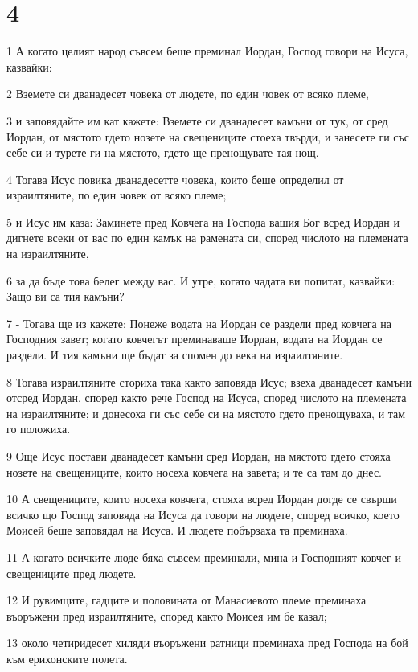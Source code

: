 \chapter{4}

\par 1 А когато целият народ съвсем беше преминал Иордан, Господ говори на Исуса, казвайки:
\par 2 Вземете си дванадесет човека от людете, по един човек от всяко племе,
\par 3 и заповядайте им кат кажете: Вземете си дванадесет камъни от тук, от сред Иордан, от мястото гдето нозете на свещениците стоеха твърди, и занесете ги със себе си и турете ги на мястото, гдето ще пренощувате тая нощ.
\par 4 Тогава Исус повика дванадесетте човека, които беше определил от израилтяните, по един човек от всяко племе;
\par 5 и Исус им каза: Заминете пред Ковчега на Господа вашия Бог всред Иордан и дигнете всеки от вас по един камък на рамената си, според числото на племената на израилтяните,
\par 6 за да бъде това белег между вас. И утре, когато чадата ви попитат, казвайки: Защо ви са тия камъни?
\par 7 - Тогава ще из кажете: Понеже водата на Иордан се раздели пред ковчега на Господния завет; когато ковчегът преминаваше Иордан, водата на Иордан се раздели. И тия камъни ще бъдат за спомен до века на израилтяните.
\par 8 Тогава израилтяните сториха така както заповяда Исус; взеха дванадесет камъни отсред Иордан, според както рече Господ на Исуса, според числото на племената на израилтяните; и донесоха ги със себе си на мястото гдето пренощуваха, и там го положиха.
\par 9 Още Исус постави дванадесет камъни сред Иордан, на мястото гдето стояха нозете на свещениците, които носеха ковчега на завета; и те са там до днес.
\par 10 А свещениците, които носеха ковчега, стояха всред Иордан догде се свърши всичко що Господ заповяда на Исуса да говори на людете, според всичко, което Моисей беше заповядал на Исуса. И людете побързаха та преминаха.
\par 11 А когато всичките люде бяха съвсем преминали, мина и Господният ковчег и свещениците пред людете.
\par 12 И рувимците, гадците и половината от Манасиевото племе преминаха въоръжени пред израилтяните, според както Моисея им бе казал;
\par 13 около четиридесет хиляди въоръжени ратници преминаха пред Господа на бой към ерихонските полета.
